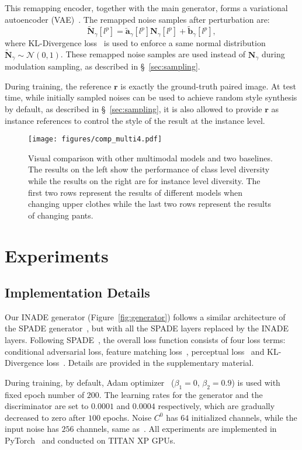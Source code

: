 \documentclass[final]{cvpr}
\begin{document}
This remapping encoder, together with the main generator, forms a variational autoencoder (VAE)~\cite{kingma2013auto}. The remapped noise samples after perturbation are:
\begin{equation}
   \tilde{\bm{N}}_\gamma[l^p]=\tilde{\bm{a}}_\gamma[l^p]\bm{N}_\gamma[l^p]+\tilde{\bm{b}}_\gamma[l^p],
\end{equation}
where KL-Divergence loss~\cite{kingma2013auto} is used to enforce a same normal distribution $\tilde{\bm{N}}_\gamma\sim\mathcal{N}(0,1)$. These remapped noise samples are used instead of $\bm{N}_\gamma$ during modulation sampling, as described in \S~\ref{sec:sampling}.

During training, the reference $\bm{r}$ is exactly the ground-truth paired image. At test time, while initially sampled noises can be used to achieve random style synthesis by default, as described in \S~\ref{sec:sampling}, it is also allowed to provide $\bm{r}$ as instance references to control the style of the result at the instance level.

\begin{figure*}[tp]
  \centering
  \texttt{[image: figures/comp\_multi4.pdf]}
  \caption{Visual comparison with other multimodal models and two baselines. The results on the left show the performance of class level diversity while the results on the right are for instance level diversity. The first two rows represent the results of different models when changing upper clothes while the last two rows represent the results of changing pants. }
  \label{fig:results_multi}
\end{figure*}
\section{Experiments}
\subsection{Implementation Details}
Our INADE generator (Figure~\ref{fig:generator}) follows a similar architecture of the SPADE generator~\cite{park2019semantic}, but with all the SPADE layers replaced by the INADE layers. 
Following SPADE~\cite{park2019semantic}, the overall loss function consists of four loss terms: conditional adversarial loss, feature matching loss~\cite{wang2018high}, perceptual loss~\cite{johnson2016perceptual} and KL-Divergence loss~\cite{kingma2013auto}. Details are provided in the supplementary material.

During training, by default, Adam optimizer~\cite{kingma2015adam} ($\beta_1=0$, $\beta_2=0.9$) is used with fixed epoch number of $200$. The learning rates for the generator and the discriminator are set to $0.0001$ and $0.0004$ respectively, which are gradually decreased to zero after $100$ epochs. Noise $C^0$ has $64$ initialized channels, while the input noise has $256$ channels, same as~\cite{park2019semantic,liu2019learning}. 
All experiments are implemented in PyTorch~\cite{paszke2019pytorch} and conducted on TITAN XP GPUs.
\end{document}
